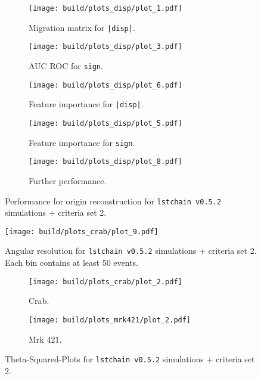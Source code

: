\begin{figure}
    \centering
    \begin{subfigure}{0.49\textwidth}
        \centering
        \texttt{[image: build/plots\_disp/plot\_1.pdf]}
        \caption{Migration matrix for \texttt{|disp|}.}
    \end{subfigure}
    \hfill
    \begin{subfigure}{0.49\textwidth}
        \centering
        \texttt{[image: build/plots\_disp/plot\_3.pdf]}
        \caption{AUC ROC for \texttt{sign}.}
    \end{subfigure}
    \newline\vfill
    \begin{subfigure}{0.49\textwidth}
        \centering
        \texttt{[image: build/plots\_disp/plot\_6.pdf]}
        \caption{Feature importance for \texttt{|disp|}.}
    \end{subfigure}
    \hfill
    \begin{subfigure}{0.49\textwidth}
        \centering
        \texttt{[image: build/plots\_disp/plot\_5.pdf]}
        \caption{Feature importance for \texttt{sign}.}
    \end{subfigure}
    \newline\vfill
    \begin{subfigure}{0.49\textwidth}
        \centering
        \texttt{[image: build/plots\_disp/plot\_8.pdf]}
        \caption{Further performance.}
        \label{fig:origin_newMC_150_e}
    \end{subfigure}
    \caption{Performance for origin reconstruction for \texttt{lstchain v0.5.2} simulations + criteria set 2.}
    \label{fig:origin_newMC_150}
\end{figure}

\begin{figure}
    \centering
    \texttt{[image: build/plots\_crab/plot\_9.pdf]}
    \caption{Angular resolution for \texttt{lstchain v0.5.2} simulations + criteria set 2.
        Each bin contains at least 50 events.
    }
    \label{fig:ang_res_newMC_150}
\end{figure}

\begin{figure}
    \centering
    \begin{subfigure}{0.49\textwidth}
        \centering
        \texttt{[image: build/plots\_crab/plot\_2.pdf]}
        \caption{Crab.}
        \label{fig:crab_newMC_150}
    \end{subfigure}
    \hfill
    \begin{subfigure}{0.49\textwidth}
        \centering
        \texttt{[image: build/plots\_mrk421/plot\_2.pdf]}
        \caption{Mrk 421.}
        \label{fig:mrk_newMC_150}
    \end{subfigure}
    \caption{Theta-Squared-Plots for \texttt{lstchain v0.5.2} simulations + criteria set 2.}
    \label{fig:obs_newMC_150}
\end{figure}



